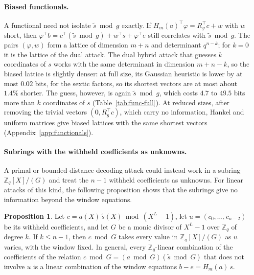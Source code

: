 \documentclass[11pt,a4paper]{article}
\theoremstyle{definition}
\newtheorem{proposition}{Proposition}
\newcommand{\Zq}{\mathbb{Z}_q}
\begin{document}
\paragraph{Biased functionals.} A functional need not isolate $\tilde{s} \bmod g$ exactly. If $H_m(a)^{\top}\varphi = R_g^{\top} c + w$ with $w$ short, then $\varphi^{\top} b = c^{\top}(\tilde{s} \bmod g) + w^{\top} s + \varphi^{\top} e$ still correlates with $\tilde{s} \bmod g$. The pairs $(\varphi, w)$ form a lattice of dimension $m + n$ and determinant $q^{n-k}$; for $k = 0$ it is the lattice of the dual attack. The dual hybrid attack that guesses $k$ coordinates of $s$ works with the same determinant in dimension $m + n - k$, so the biased lattice is slightly denser: at full size, its Gaussian heuristic is lower by at most $0.02$ bits, for the sextic factors, so its shortest vectors are at most about $1.4\%$ shorter. The guess, however, is again $\tilde{s} \bmod g$, which costs $4.7$ to $49.5$ bits more than $k$ coordinates of $s$ (Table~\ref{tab:func-full}). At reduced sizes, after removing the trivial vectors $(0, R_g^{\top} c)$, which carry no information, Hankel and uniform matrices give biased lattices with the same shortest vectors (Appendix~\ref{app:functionals}).

\paragraph{Subrings with the withheld coefficients as unknowns.} A primal or bounded-distance-decoding attack could instead work in a subring $\Zq[X]/(G)$ and treat the $n - 1$ withheld coefficients as unknowns. For linear attacks of this kind, the following proposition shows that the subrings give no information beyond the window equations.

\begin{proposition}\label{prop:subring}
Let $c = a(X)\,\tilde{s}(X) \bmod (X^L - 1)$, let $u = (c_0, \dots, c_{n-2})$ be its withheld coefficients, and let $G$ be a monic divisor of $X^L - 1$ over $\Zq$ of degree $k$. If $k \le n - 1$, then $c \bmod G$ takes every value in $\Zq[X]/(G)$ as $u$ varies, with the window fixed. In general, every $\Zq$-linear combination of the coefficients of the relation $c \bmod G = (a \bmod G)(\tilde{s} \bmod G)$ that does not involve $u$ is a linear combination of the window equations $b - e = H_m(a)\,s$.
\end{proposition}
\end{document}
